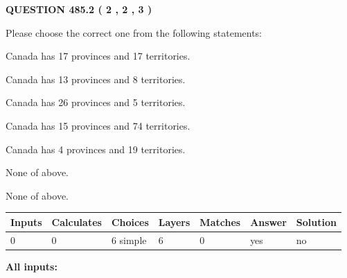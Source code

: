 \documentclass[12pt]{article}
\begin{document}
   
  
\vspace{0.2in}
  
{\textbf{\Large{QUESTION
485.2 
 ( 2 , 2 , 3 )
}}}
  
  
Please choose the correct one from the following statements:
 
 
Canada has  17 provinces and  17 territories.
 
 
Canada has  13 provinces and  8 territories.
 
 
Canada has  26 provinces and  5 territories.
 
 
Canada has  15 provinces and  74 territories.
 
 
Canada has   4 provinces and  19 territories.
 
 
 None of above.
 
 
\noindent{}
 
 
 None of above.
 
 
\noindent{}
 
 
   
   
   
   
\noindent\begin{tabular}{|l|l|l|l|l|l|l|}
 \hline
Inputs & Calculates & Choices & Layers & Matches & Answer & Solution \\ \hline
 0  & 
 0  & 
 6
  simple  
  & 
 6  & 
 0  & 
  yes & 
  no 
  \\ \hline
 \end{tabular}
   
   
   
   
\noindent{}
   
   
   
   
\noindent\vspace{0.1in}\hspace{-0.08in} {\textbf{\Large{All inputs: }}}
   
   
   
   
   
   
 \vspace{0.2in}
 
\end{document}
